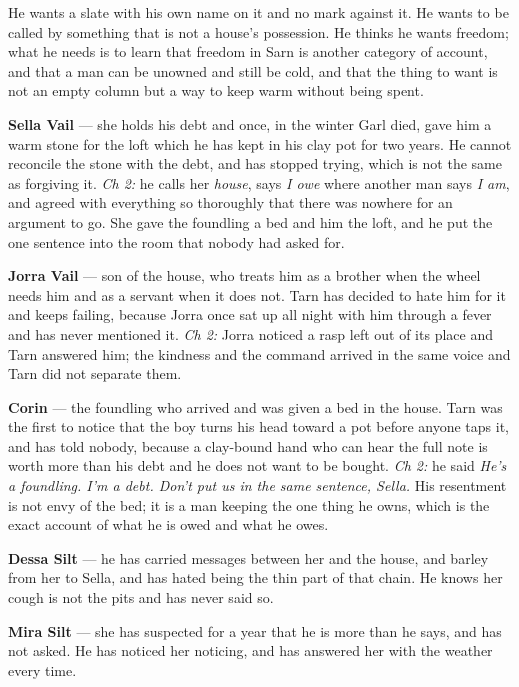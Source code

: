 \documentclass{design/chronicle}
\begin{document}
{
He wants a slate with his own name on it and no mark against it. He wants to be called by something that is not a house’s possession. He thinks he wants freedom; what he needs is to learn that freedom in Sarn is another category of account, and that a man can be unowned and still be cold, and that the thing to want is not an empty column but a way to keep warm without being spent.

\textbf{Sella Vail} — she holds his debt and once, in the winter Garl died, gave him a warm stone for the loft which he has kept in his clay pot for two years. He cannot reconcile the stone with the debt, and has stopped trying, which is not the same as forgiving it. \emph{Ch 2:} he calls her \emph{house}, says \emph{I owe} where another man says \emph{I am}, and agreed with everything so thoroughly that there was nowhere for an argument to go. She gave the foundling a bed and him the loft, and he put the one sentence into the room that nobody had asked for.

\textbf{Jorra Vail} — son of the house, who treats him as a brother when the wheel needs him and as a servant when it does not. Tarn has decided to hate him for it and keeps failing, because Jorra once sat up all night with him through a fever and has never mentioned it. \emph{Ch 2:} Jorra noticed a rasp left out of its place and Tarn answered him; the kindness and the command arrived in the same voice and Tarn did not separate them.

\textbf{Corin} — the foundling who arrived and was given a bed in the house. Tarn was the first to notice that the boy turns his head toward a pot before anyone taps it, and has told nobody, because a clay-bound hand who can hear the full note is worth more than his debt and he does not want to be bought. \emph{Ch 2:} he said \emph{He’s a foundling. I’m a debt. Don’t put us in the same sentence, Sella.} His resentment is not envy of the bed; it is a man keeping the one thing he owns, which is the exact account of what he is owed and what he owes.

\textbf{Dessa Silt} — he has carried messages between her and the house, and barley from her to Sella, and has hated being the thin part of that chain. He knows her cough is not the pits and has never said so.

\textbf{Mira Silt} — she has suspected for a year that he is more than he says, and has not asked. He has noticed her noticing, and has answered her with the weather every time.

}
\end{document}
